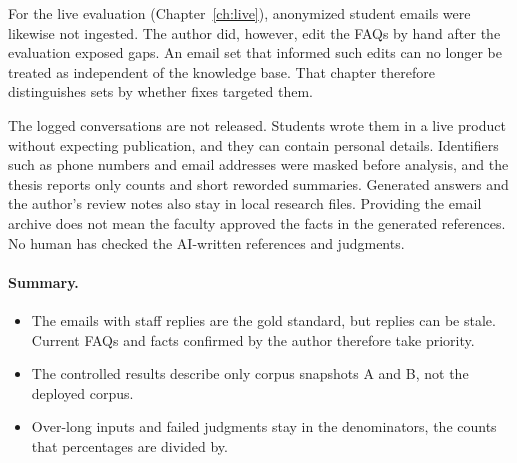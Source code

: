 For the live evaluation (Chapter~\ref{ch:live}), anonymized student emails were likewise not ingested. The author did, however, edit the FAQs by hand after the evaluation exposed gaps. An email set that informed such edits can no longer be treated as independent of the knowledge base. That chapter therefore distinguishes sets by whether fixes targeted them.

The logged conversations are not released. Students wrote them in a live product without expecting publication, and they can contain personal details. Identifiers such as phone numbers and email addresses were masked before analysis, and the thesis reports only counts and short reworded summaries. Generated answers and the author's review notes also stay in local research files. Providing the email archive does not mean the faculty approved the facts in the generated references. No human has checked the AI-written references and judgments.

\paragraph{Summary.}
\begin{itemize}
  \item The emails with staff replies are the gold standard, but replies can be stale. Current FAQs and facts confirmed by the author therefore take priority.
  \item The controlled results describe only corpus snapshots A and B, not the deployed corpus.
  \item Over-long inputs and failed judgments stay in the denominators, the counts that percentages are divided by.
\end{itemize}
